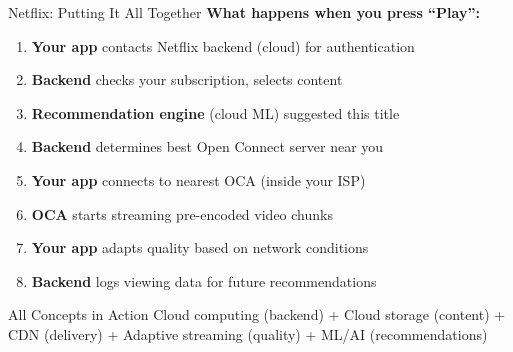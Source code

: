 \documentclass[aspectratio=169,12pt]{beamer}
\begin{document}
\begin{frame}{Netflix: Putting It All Together}
    \textbf{What happens when you press ``Play'':}
    
    \vspace{0.3cm}
    \begin{enumerate}
        \item \textbf{Your app} contacts Netflix backend (cloud) for authentication
        \item \textbf{Backend} checks your subscription, selects content
        \item \textbf{Recommendation engine} (cloud ML) suggested this title
        \item \textbf{Backend} determines best Open Connect server near you
        \item \textbf{Your app} connects to nearest OCA (inside your ISP)
        \item \textbf{OCA} starts streaming pre-encoded video chunks
        \item \textbf{Your app} adapts quality based on network conditions
        \item \textbf{Backend} logs viewing data for future recommendations
    \end{enumerate}
    
    \vspace{0.3cm}
    \begin{block}{All Concepts in Action}
        Cloud computing (backend) + Cloud storage (content) + CDN (delivery) + Adaptive streaming (quality) + ML/AI (recommendations)
    \end{block}
\end{frame}
\end{document}
